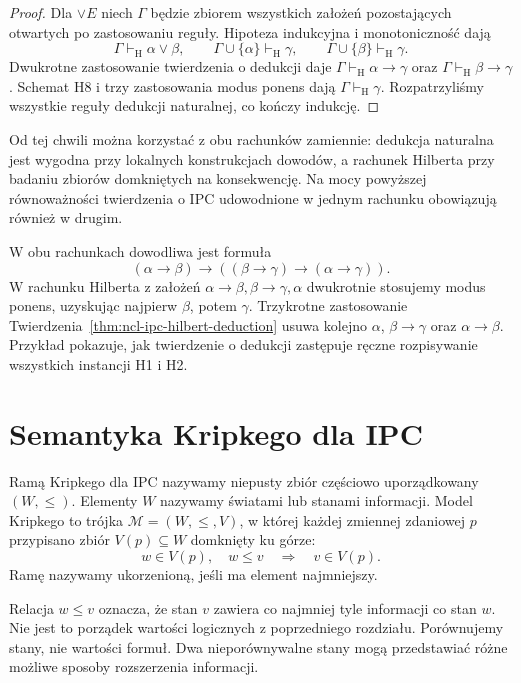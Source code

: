 \begin{proof}
Dla $\vee E$ niech $\Gamma$ będzie zbiorem
wszystkich założeń pozostających otwartych
po zastosowaniu reguły. Hipoteza indukcyjna
i monotoniczność dają
\[
 \Gamma\vdash_{\mathrm H}\alpha\vee\beta,\qquad
 \Gamma\cup\{\alpha\}\vdash_{\mathrm H}\gamma,\qquad
 \Gamma\cup\{\beta\}\vdash_{\mathrm H}\gamma.
\]
Dwukrotne zastosowanie twierdzenia o dedukcji daje
$\Gamma\vdash_{\mathrm H}\alpha\to\gamma$ oraz
$\Gamma\vdash_{\mathrm H}\beta\to\gamma$.
Schemat H8 i trzy zastosowania modus ponens
dają $\Gamma\vdash_{\mathrm H}\gamma$.
Rozpatrzyliśmy wszystkie reguły dedukcji naturalnej,
co kończy indukcję.
\end{proof}

Od tej chwili można korzystać z obu rachunków
zamiennie: dedukcja naturalna jest wygodna przy
lokalnych konstrukcjach dowodów, a rachunek Hilberta
przy badaniu zbiorów domkniętych na konsekwencję.
Na mocy powyższej równoważności twierdzenia o IPC
udowodnione w jednym rachunku obowiązują również
w drugim.

\begin{przyklad}
\label{ex:ncl-ipc-hilbert-transitivity}
W obu rachunkach dowodliwa jest formuła
\[
 (\alpha\to\beta)\to
 ((\beta\to\gamma)\to(\alpha\to\gamma)).
\]
W rachunku Hilberta z założeń
$\alpha\to\beta,\beta\to\gamma,\alpha$
dwukrotnie stosujemy modus ponens, uzyskując
najpierw $\beta$, potem $\gamma$.
Trzykrotne zastosowanie
Twierdzenia~\ref{thm:ncl-ipc-hilbert-deduction}
usuwa kolejno $\alpha$, $\beta\to\gamma$ oraz
$\alpha\to\beta$. Przykład pokazuje, jak twierdzenie
o dedukcji zastępuje ręczne rozpisywanie wszystkich
instancji H1 i H2.
\end{przyklad}

\section{Semantyka Kripkego dla IPC}

\begin{definicja}
\label{def:ncl-ipc-kripke}
Ramą Kripkego dla IPC nazywamy niepusty zbiór
częściowo uporządkowany $(W,\leq)$. Elementy $W$
nazywamy światami lub stanami informacji.
Model Kripkego to trójka $\mathcal M=(W,\leq,V)$,
w której każdej zmiennej zdaniowej $p$
przypisano zbiór $V(p)\subseteq W$ domknięty ku górze:
\[
 w\in V(p),\quad w\leq v\quad\Longrightarrow\quad
 v\in V(p).
\]
Ramę nazywamy ukorzenioną, jeśli ma element najmniejszy.
\end{definicja}
Relacja $w\leq v$ oznacza, że stan $v$ zawiera
co najmniej tyle informacji co stan $w$.
Nie jest to porządek wartości logicznych z poprzedniego
rozdziału. Porównujemy stany, nie wartości formuł.
Dwa nieporównywalne stany mogą przedstawiać
różne możliwe sposoby rozszerzenia informacji.

